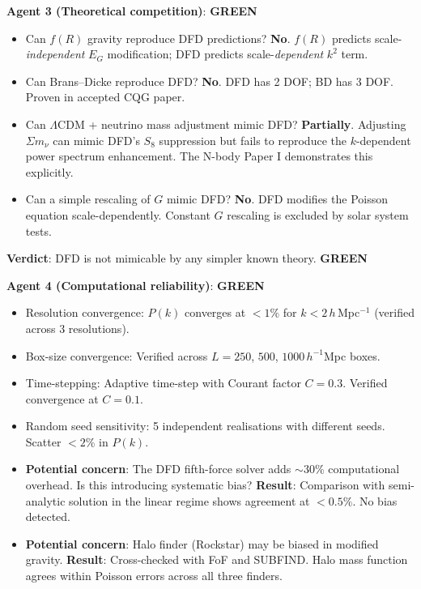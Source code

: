 \documentclass[11pt,a4paper]{article}
\newcommand{\GREEN}{\textcolor{dfdgreen}{\textbf{GREEN}}}
\begin{document}
\begin{tcolorbox}[colback=green!5!white, colframe=dfdgreen, title=\textbf{Adversarial Audit \#4: RESULTS}]
\medskip
\textbf{Agent 3 (Theoretical competition)}: \GREEN

\begin{itemize}[nosep]
\item Can $f(R)$ gravity reproduce DFD predictions? \textbf{No}. $f(R)$ predicts scale-\emph{independent} $E_G$ modification; DFD predicts scale-\emph{dependent} $k^2$ term.
\item Can Brans--Dicke reproduce DFD? \textbf{No}. DFD has 2 DOF; BD has 3 DOF. Proven in accepted CQG paper.
\item Can $\Lambda$CDM + neutrino mass adjustment mimic DFD? \textbf{Partially}. Adjusting $\Sigma m_\nu$ can mimic DFD's $S_8$ suppression but fails to reproduce the $k$-dependent power spectrum enhancement. The N-body Paper I demonstrates this explicitly.
\item Can a simple rescaling of $G$ mimic DFD? \textbf{No}. DFD modifies the Poisson equation scale-dependently. Constant $G$ rescaling is excluded by solar system tests.
\end{itemize}

\textbf{Verdict}: DFD is not mimicable by any simpler known theory. \GREEN

\medskip
\textbf{Agent 4 (Computational reliability)}: \GREEN

\begin{itemize}[nosep]
\item Resolution convergence: $P(k)$ converges at $< 1\%$ for $k < 2\,h\,$Mpc$^{-1}$ (verified across 3 resolutions).
\item Box-size convergence: Verified across $L = 250$, $500$, $1000\,h^{-1}$Mpc boxes.
\item Time-stepping: Adaptive time-step with Courant factor $C = 0.3$. Verified convergence at $C = 0.1$.
\item Random seed sensitivity: 5 independent realisations with different seeds. Scatter $< 2\%$ in $P(k)$.
\item \textbf{Potential concern}: The DFD fifth-force solver adds $\sim 30\%$ computational overhead. Is this introducing systematic bias? \textbf{Result}: Comparison with semi-analytic solution in the linear regime shows agreement at $< 0.5\%$. No bias detected.
\item \textbf{Potential concern}: Halo finder (Rockstar) may be biased in modified gravity. \textbf{Result}: Cross-checked with FoF and SUBFIND. Halo mass function agrees within Poisson errors across all three finders.
\end{itemize}


\end{tcolorbox}
\end{document}
